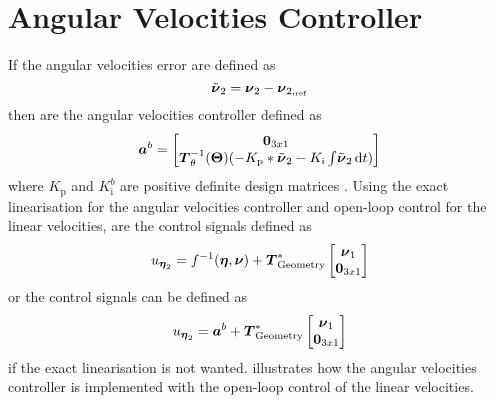 \section{Angular Velocities Controller}  

If the angular velocities error are defined as 
\begin{equation}
\nuTildeAng = \nuVectorAng - \nuVectorAng[,_{\text{ref}}]
\end{equation}
then are the \abbrPI angular velocities controller defined as 
\begin{equation}
	\accVector^b = \begin{bmatrix} 
	\zeroCol{3} \\
	\boldsymbol{T}^{-1}_\theta(\eulerAngles)(-K_{\text{p}}*\nuTildeAng - K_{\text{i}}\int \! \nuTildeAng \, \mathrm{d}t)
	\end{bmatrix}
\end{equation}
where $K_{\text{p}}$ and $K_{\text{i}}^b$ are positive definite design matrices \citep[p. 453]{fossen2011}.
Using the exact linearisation for the angular velocities controller and open-loop control for the linear velocities, are the control signals defined as
\begin{equation}
	u_{\etaVectorAng} = f^{-1}(\etaVector,\nuVector) + \thrusterGeometryOnes[*] \begin{bmatrix} \nuVectorLin \\ \zeroCol{3} \end{bmatrix}	
\end{equation}
or the control signals can be defined as 
\begin{equation}
	u_{\etaVectorAng} = \accVector^b + \thrusterGeometryOnes[*] \begin{bmatrix} \nuVectorLin \\ \zeroCol{3} \end{bmatrix}
\end{equation}
if the exact linearisation is not wanted.  illustrates how the angular velocities controller is implemented with the open-loop control of the linear velocities.
